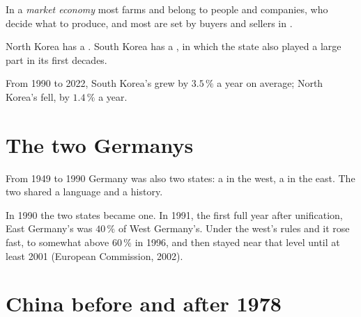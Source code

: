 \begin{definition}\label{def:g9:institutions-and-prosperity:market-economy}
In a \emph{market economy} most farms and  belong to people and companies, who
decide what to produce, and most  are set by buyers and sellers in .
\end{definition}

North Korea has a . South Korea has a , in which the state also played a large part in
its first decades.

From 1990 to 2022, South Korea's  grew by $3.5\,\%$ a year on average; North Korea's fell, by
$1.4\,\%$ a year.

\section{The two Germanys}

From 1949 to 1990 Germany was also two states: a  in the west, a  in the
east. The two shared a language and a history.

\begin{record}[Germany, 1949--1990]
In 1990 the two states became one. In 1991, the first full year after unification, East Germany's  was $40\,\%$ of West Germany's. Under the west's rules and  it rose fast, to somewhat above $60\,\%$ in
1996, and then stayed near that level until at least 2001 (European Commission, 2002).
\end{record}

\section{China before and after 1978}

